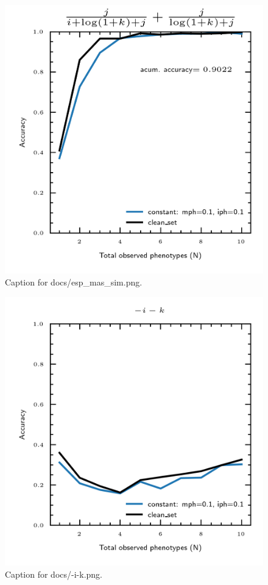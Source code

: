 \documentclass{article}
\begin{document}
\begin{figure}[h] \centering \includegraphics{docs/esp_mas_sim.png} \caption{Caption for docs/esp_mas_sim.png.} \end{figure}
\begin{figure}[h] \centering \includegraphics{docs/-i-k.png} \caption{Caption for docs/-i-k.png.} \end{figure}
\end{document}
